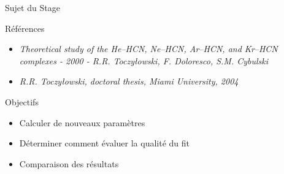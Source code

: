 \documentclass[10pt, aspectratio=169]{beamer}
\begin{document}
\begin{frame}{Sujet du Stage}

  \begin{exampleblock}{Références}
    \begin{itemize}
      \item \textit{Theoretical study of the He–HCN, Ne–HCN, Ar–HCN,
        and Kr–HCN complexes - 2000 - R.R. Toczyłowski, F. Doloresco, S.M. Cybulski}
    \item \textit{R.R. Toczyłowski, doctoral thesis, Miami University, 2004}
  \end{itemize} 
  \end{exampleblock}
  
  \begin{block}{Objectifs}
  \begin{itemize}
    \item Calculer de nouveaux paramètres
    \item Déterminer comment évaluer la qualité du fit
    \item Comparaison des résultats
  \end{itemize}
\end{block}
 
\end{frame}
\end{document}
